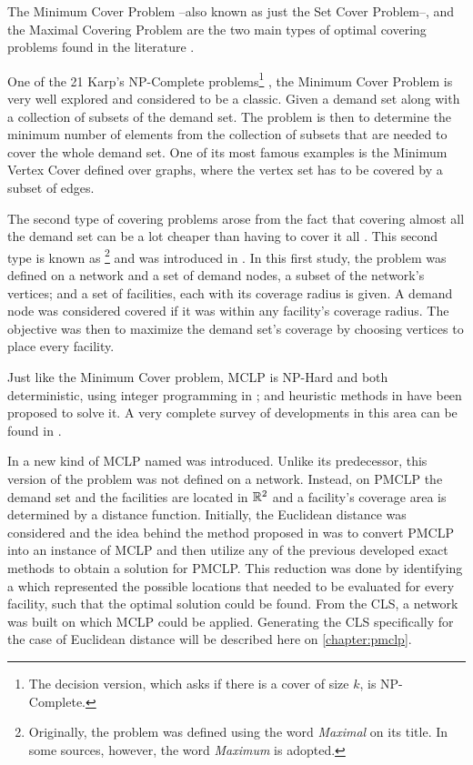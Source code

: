 The Minimum Cover Problem --also known as just the Set Cover Problem--, and the Maximal Covering Problem are the two main types of optimal covering problems found in the literature \cite{karatas}. 

One of the 21 Karp's NP-Complete problems\footnote{The decision version, which asks if there is a cover of size $k$, is NP-Complete.} \cite{karp}, the Minimum Cover Problem is very well explored and considered to be a classic. 
Given a demand set along with a collection of subsets of the demand set. The problem is then to determine the minimum number of elements from the collection of subsets that are needed to cover the whole demand set. One of its most famous examples is the Minimum Vertex Cover defined over graphs, where the vertex set has to be covered by a subset of edges.

The second type of covering problems arose from the fact that covering almost all the demand set can be a lot cheaper than having to cover it all \cite{garcia}. This second type is known as \footnote{Originally, the problem was defined using the word \textit{Maximal} on its title. In some sources, however, the word \textit{Maximum} is adopted.} and was introduced in .
In this first study, the problem was defined on a network and a set of demand nodes, a subset of the network's vertices; and a set of facilities, each with its coverage radius is given. 
A demand node was considered covered if it was within any facility's coverage radius. The objective was then to maximize the demand set's coverage by choosing vertices to place every facility.

Just like the Minimum Cover problem, MCLP is NP-Hard \cite{hatta:2013} and both deterministic, using integer programming in ; and heuristic methods in  have been proposed to solve it. A very complete survey of developments in this area can be found in .

In  a new kind of MCLP named  was introduced. Unlike its predecessor, this version of the problem was not defined on a network. Instead, on PMCLP the demand set and the facilities are located in $\mathbb{R}^2$ and a facility's coverage area is determined by a distance function. 
Initially, the Euclidean distance was considered and the idea behind the method proposed in  was to convert PMCLP into an instance of MCLP and then utilize any of the previous developed exact methods to obtain a solution for PMCLP. This reduction was done by identifying a  which represented the possible locations that needed to be evaluated for every facility, such that the optimal solution could be found. From the CLS, a network was built on which MCLP could be applied. Generating the CLS specifically for the case of Euclidean distance will be described here on \autoref{chapter:pmclp}.

